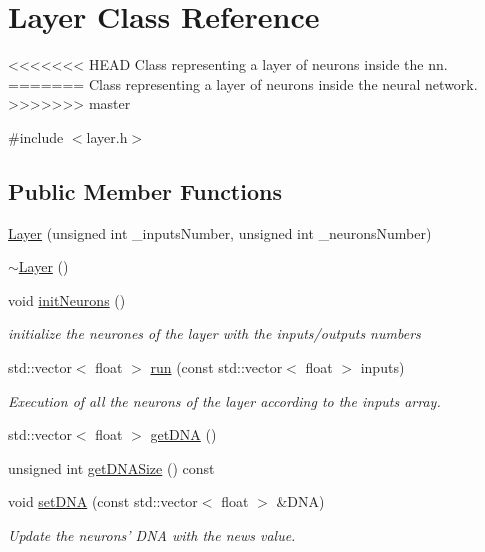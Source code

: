 \hypertarget{class_layer}{\section{Layer Class Reference}
\label{class_layer}
}


<<<<<<< HEAD
Class representing a layer of neurons inside the nn.  
=======
Class representing a layer of neurons inside the neural network.  
>>>>>>> master




{\ttfamily \#include $<$layer.\-h$>$}

\subsection*{Public Member Functions}
\begin{DoxyCompactItemize}
\item 
\hyperlink{class_layer_a16d6a7a3cff2e9e489186400a9d0f4f2}{Layer} (unsigned int \-\_\-inputs\-Number, unsigned int \-\_\-neurons\-Number)
\item 
\hyperlink{class_layer_a1b1ba4804451dfe6cc357194e42762ae}{$\sim$\-Layer} ()
\item 
void \hyperlink{class_layer_a08ee50fd54abe23d9fc94551c7b4be3f}{init\-Neurons} ()
\begin{DoxyCompactList}\small\item\em initialize the neurones of the layer with the inputs/outputs numbers \end{DoxyCompactList}\item 
std\-::vector$<$ float $>$ \hyperlink{class_layer_a33387425a6f32b455bdca87496a891c9}{run} (const std\-::vector$<$ float $>$ inputs)
\begin{DoxyCompactList}\small\item\em Execution of all the neurons of the layer according to the inputs array. \end{DoxyCompactList}\item 
std\-::vector$<$ float $>$ \hyperlink{class_layer_a18d9fa45eb9ff61f5d5bb9c74179bf30}{get\-D\-N\-A} ()
\item 
unsigned int \hyperlink{class_layer_a01093e904ef7331b99fccc9abe1174aa}{get\-D\-N\-A\-Size} () const 
\item 
void \hyperlink{class_layer_acd14a68865522c3e63a0dab87dd3a100}{set\-D\-N\-A} (const std\-::vector$<$ float $>$ \&D\-N\-A)
\begin{DoxyCompactList}\small\item\em Update the neurons' D\-N\-A with the news value. \end{DoxyCompactList}\end{DoxyCompactItemize}


